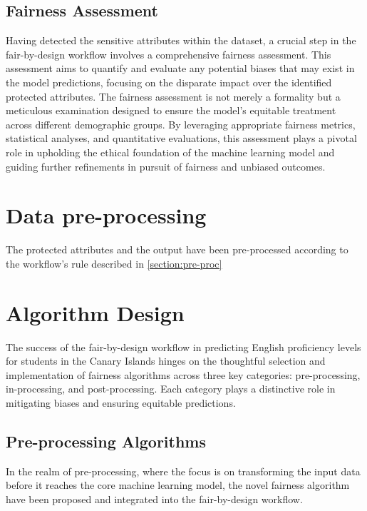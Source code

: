 \subsection{Fairness Assessment}

Having detected the sensitive attributes within the dataset, a crucial step in the fair-by-design workflow involves a comprehensive fairness assessment. This assessment aims to quantify and evaluate any potential biases that may exist in the model predictions, focusing on the disparate impact over the identified protected attributes. The fairness assessment is not merely a formality but a meticulous examination designed to ensure the model's equitable treatment across different demographic groups. By leveraging appropriate fairness metrics, statistical analyses, and quantitative evaluations, this assessment plays a pivotal role in upholding the ethical foundation of the machine learning model and guiding further refinements in pursuit of fairness and unbiased outcomes.

\section{Data pre-processing}

The protected attributes and the output have been pre-processed according to the workflow's rule described in \cref{section:pre-proc}

\section{Algorithm Design}

The success of the fair-by-design workflow in predicting English proficiency levels for students in the Canary Islands hinges on the thoughtful selection and implementation of fairness algorithms across three key categories: pre-processing, in-processing, and post-processing. Each category plays a distinctive role in mitigating biases and ensuring equitable predictions.

\subsection{Pre-processing Algorithms}

In the realm of pre-processing, where the focus is on transforming the input data before it reaches the core machine learning model, the novel fairness algorithm have been proposed and integrated into the fair-by-design workflow.

